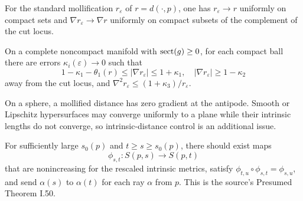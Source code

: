 \begin{lemma}
\label{lem:chow-iii-i45-mollified-distance}
For the standard mollification $r_\varepsilon$ of $r=d(\cdot,p)$, one has
$r_\varepsilon\to r$ uniformly on compact sets and
$\nabla r_\varepsilon\to\nabla r$ uniformly on compact subsets of the complement
of the cut locus.
\end{lemma}

\begin{lemma}
\label{lem:chow-iii-i47-mollified-derivatives}
On a complete noncompact manifold with $\operatorname{sect}(g)\ge0$, for each compact ball
there are errors $\kappa_i(\varepsilon)\to0$ such that
\[
1-\kappa_1-\theta_1(r)\le|\nabla r_\varepsilon|\le1+\kappa_1,
\quad |\nabla r_\varepsilon|\ge1-\kappa_2
\]
away from the cut locus, and
$\nabla^2r_\varepsilon\le(1+\kappa_3)/r_\varepsilon$.
\end{lemma}

\begin{example}
\label{ex:chow-iii-i46-i49-mollification}
On a sphere, a mollified distance has zero gradient at the antipode.  Smooth or
Lipschitz hypersurfaces may converge uniformly to a plane while their intrinsic
lengths do not converge, so intrinsic-distance control is an additional issue.
\end{example}

\begin{claim}
\label{clm:chow-iii-i50-large-sphere-maps}
For sufficiently large $s_0(p)$ and $t\ge s\ge s_0(p)$, there should exist maps
\[
\phi_{s,t}:S(p,s)\to S(p,t)
\]
that are nonincreasing for the rescaled intrinsic metrics, satisfy
$\phi_{t,u}\circ\phi_{s,t}=\phi_{s,u}$, and send $\alpha(s)$ to $\alpha(t)$
for each ray $\alpha$ from $p$.  This is the source's Presumed Theorem I.50.
\end{claim}

